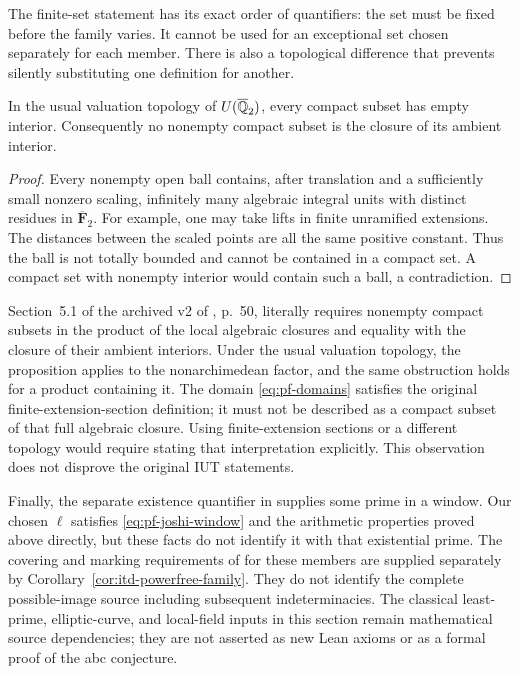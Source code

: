 The finite-set statement has its exact order of quantifiers: the set
must be fixed before the family varies. It cannot be used for an
exceptional set chosen separately for each member. There is also a
topological difference that prevents silently substituting one definition
for another.

\begin{proposition}
\label{prop:powerfree-literal-compact}
In the usual valuation topology of \(U(\overline{\mathbb Q}_2)\), every compact
subset has empty interior. Consequently no nonempty compact subset is
the closure of its ambient interior.
\end{proposition}

\begin{proof}
Every nonempty open ball contains, after translation and a sufficiently
small nonzero scaling, infinitely many algebraic integral units with
distinct residues in \(\overline{\mathbf F}_2\). For example, one may
take lifts in finite unramified extensions. The distances between the
scaled points are all the same positive constant. Thus the ball is not
totally bounded and cannot be contained in a compact set. A compact
set with nonempty interior would contain such a ball, a contradiction.
\end{proof}

Section~5.1 of the archived v2 of \cite{JoshiIV}, p.~50, literally
requires nonempty compact subsets in the product of the local algebraic
closures and equality with the closure of their ambient interiors.
Under the usual valuation topology, the proposition applies to the
nonarchimedean factor, and the same obstruction holds for a product
containing it. The domain \eqref{eq:pf-domains} satisfies the original
finite-extension-section definition; it must not be described as a
compact subset of that full algebraic closure. Using finite-extension
sections or a different topology would require stating that interpretation
explicitly. This observation does not disprove the original IUT statements.

Finally, the separate existence quantifier in
\cite[Theorem~5.7.1, p.~53]{JoshiIV} supplies some prime in a window.
Our chosen \(\ell\) satisfies \eqref{eq:pf-joshi-window} and the arithmetic
properties proved above directly, but these facts do not identify it
with that existential prime. The covering and marking requirements of
\cite[Definition~3.1]{IUT1} for these members are supplied separately
by Corollary~\ref{cor:itd-powerfree-family}. They do not identify the
complete possible-image source including subsequent indeterminacies.
The classical least-prime,
elliptic-curve, and local-field inputs in this section remain mathematical
source dependencies; they are not asserted as new Lean axioms or as a
formal proof of the abc conjecture.
